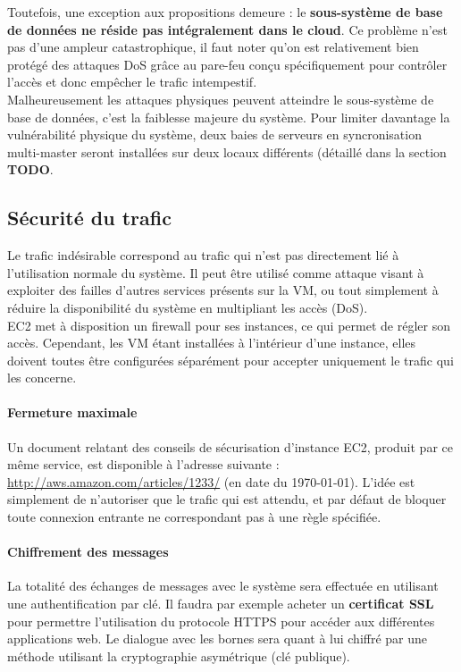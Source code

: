 Toutefois, une exception aux propositions demeure : le \textbf{sous-système de
base de données ne réside pas intégralement dans le cloud}. Ce problème n'est
pas d'une ampleur catastrophique, il faut noter qu'on est relativement bien
protégé des attaques DoS grâce au pare-feu conçu spécifiquement pour contrôler
l'accès et donc empêcher le trafic intempestif. \\

Malheureusement les attaques physiques peuvent atteindre le sous-système de
base de données, c'est la faiblesse majeure du système. Pour limiter davantage
la vulnérabilité physique du système, deux baies de serveurs en syncronisation
multi-master seront installées sur deux locaux différents (détaillé dans la
section {\huge \textbf{TODO}}.

\subsection{Sécurité du trafic}
\label{subsec:securite-trafic}

Le trafic indésirable correspond au trafic qui n'est pas directement lié à
l'utilisation normale du système. Il peut être utilisé comme attaque visant à
exploiter des failles d'autres services présents sur la VM, ou tout
simplement à réduire la disponibilité du système en multipliant les
accès (DoS). \\

EC2 met à disposition un firewall pour ses instances, ce qui permet de régler
son accès. Cependant, les VM étant installées à l'intérieur d'une instance,
elles doivent toutes être configurées séparément pour accepter uniquement le
trafic qui les concerne.

\paragraph{Fermeture maximale}

Un document relatant des conseils de sécurisation d'instance EC2, produit par
ce même service, est disponible à l'adresse suivante :
\url{http://aws.amazon.com/articles/1233/} (en date du \today). L'idée est
simplement de n'autoriser que le trafic qui est attendu, et par défaut de
bloquer toute connexion entrante ne correspondant pas à une règle spécifiée.

\paragraph{Chiffrement des messages}

La totalité des échanges de messages avec le système sera effectuée en
utilisant une authentification par clé. Il faudra par exemple acheter un
\textbf{certificat SSL} pour permettre l'utilisation du protocole HTTPS pour
accéder aux différentes applications web. Le dialogue avec les bornes sera
quant à lui chiffré par une méthode utilisant la cryptographie asymétrique (clé
publique).


